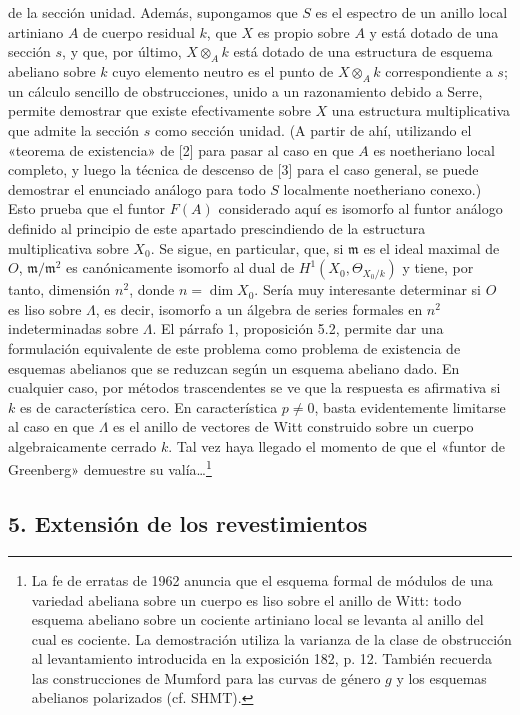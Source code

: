 de la sección unidad. Además, supongamos que $S$ es el espectro de un anillo
local artiniano $A$ de cuerpo residual $k$, que $X$ es propio sobre $A$ y está
dotado de una sección $s$, y que, por último, $X\otimes_Ak$ está dotado de una
estructura de esquema abeliano sobre $k$ cuyo elemento neutro es el punto de
$X\otimes_Ak$ correspondiente a $s$; un cálculo sencillo de obstrucciones,
unido a un razonamiento debido a Serre, permite demostrar que existe
efectivamente sobre $X$ una estructura multiplicativa que admite la sección
$s$ como sección unidad. (A partir de ahí, utilizando el «teorema de
existencia» de [2] para pasar al caso en que $A$ es noetheriano local completo,
y luego la técnica de descenso de [3] para el caso general, se puede demostrar
el enunciado análogo para todo $S$ localmente noetheriano conexo.) Esto prueba
que el funtor $F(A)$ considerado aquí es isomorfo al funtor análogo definido al
principio de este apartado prescindiendo de la estructura multiplicativa sobre
$X_0$. Se sigue, en particular, que, si $\mathfrak m$ es el ideal maximal de
$O$, $\mathfrak m/\mathfrak m^2$ es canónicamente isomorfo al dual de
$H^1(X_0,\Theta_{X_0/k})$ y tiene, por tanto, dimensión $n^2$, donde
$n=\dim X_0$. Sería muy interesante determinar si $O$ es liso sobre $\Lambda$,
es decir, isomorfo a un álgebra de series formales en $n^2$ indeterminadas
sobre $\Lambda$. El párrafo 1, proposición 5.2, permite dar una formulación
equivalente de este problema como problema de existencia de esquemas abelianos
que se reduzcan según un esquema abeliano dado. En cualquier caso, por métodos
trascendentes se ve que la respuesta es afirmativa si $k$ es de característica
cero. En característica $p\ne0$, basta evidentemente limitarse al caso en que
$\Lambda$ es el anillo de vectores de Witt construido sobre un cuerpo
algebraicamente cerrado $k$. Tal vez haya llegado el momento de que el «funtor
de Greenberg» demuestre su valía\ldots\footnote{La fe de erratas de 1962
anuncia que el esquema formal de módulos de una variedad abeliana sobre un
cuerpo es liso sobre el anillo de Witt: todo esquema abeliano sobre un cociente
artiniano local se levanta al anillo del cual es cociente. La demostración
utiliza la varianza de la clase de obstrucción al levantamiento introducida en
la exposición 182, p. 12. También recuerda las construcciones de Mumford para
las curvas de género $g$ y los esquemas abelianos polarizados (cf. SHMT).}

\subsection*{5. Extensión de los revestimientos}

